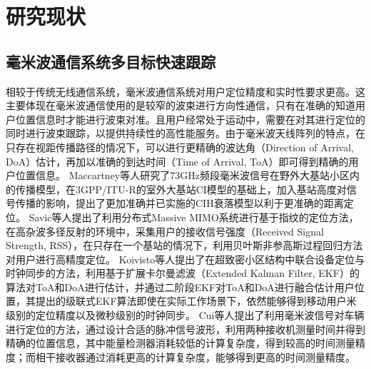 \section{研究现状}

\subsection{毫米波通信系统多目标快速跟踪}

相较于传统无线通信系统，毫米波通信系统对用户定位精度和实时性要求更高。这主要体现在毫米波通信使用的是较窄的波束进行方向性通信，只有在准确的知道用户位置信息时才能进行波束对准。且用户经常处于运动中，需要在对其进行定位的同时进行波束跟踪，以提供持续性的高性能服务。由于毫米波天线阵列的特点，在只存在视距传播路径的情况下，可以进行更精确的波达角（Direction of Arrival, DoA）估计，再加以准确的到达时间（Time of Arrival, ToA）即可得到精确的用户位置信息。
Maccartney等人研究了73GHz频段毫米波信号在野外大基站小区内的传播模型\cite{maccartney2017rural,maccartney2017study}，在3GPP/ITU-R的室外大基站CI模型的基础上，加入基站高度对信号传播的影响，提出了更加准确并已实施的CIH衰落模型以利于更准确的距离定位。
Savic等人提出了利用分布式Massive MIMO系统进行基于指纹的定位方法\cite{savic2015fingerprinting}，在高杂波多径反射的环境中，采集用户的接收信号强度（Received Signal Strength, RSS），在只存在一个基站的情况下，利用贝叶斯非参高斯过程回归方法对用户进行高精度定位。
Koivisto等人提出了在超致密小区结构中联合设备定位与时钟同步的方法\cite{koivisto2017joint,koivisto2017high}，利用基于扩展卡尔曼滤波（Extended Kalman Filter, EKF）的算法对ToA和DoA进行估计，并通过二阶段EKF对ToA和DoA进行融合估计用户位置，其提出的级联式EKF算法即使在实际工作场景下，依然能够得到移动用户米级别的定位精度以及微秒级别的时钟同步。
Cui等人提出了利用毫米波信号对车辆进行定位的方法\cite{cui2016vehicle}，通过设计合适的脉冲信号波形，利用两种接收机测量时间并得到精确的位置信息，其中能量检测器消耗较低的计算复杂度，得到较高的时间测量精度；而相干接收器通过消耗更高的计算复杂度，能够得到更高的时间测量精度。

